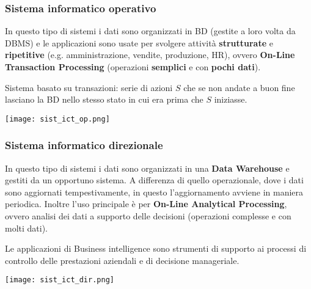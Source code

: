 \subsubsection{Sistema informatico operativo}
In questo tipo di sistemi i dati sono organizzati in BD (gestite a loro volta da DBMS) e le applicazioni sono usate per svolgere attività \textbf{strutturate} e \textbf{ripetitive} (e.g. amministrazione, vendite, produzione, HR), ovvero \textbf{On-Line Transaction Processing} (operazioni \textbf{semplici} e con \textbf{pochi dati}).
\begin{definition}
	Sistema basato su transazioni: serie di azioni $S$ che se non andate a buon fine lasciano la BD nello stesso stato in cui era prima che $S$ iniziasse.
\end{definition}
\begin{center}
	\texttt{[image: sist\_ict\_op.png]}
\end{center}

\subsubsection{Sistema informatico direzionale}
In questo tipo di sistemi i dati sono organizzati in una \textbf{Data Warehouse} e gestiti da un opportuno sistema. A differenza di quello operazionale, dove i dati sono aggiornati tempestivamente, in questo l'aggiornamento avviene in maniera periodica. Inoltre l'uso principale è per \textbf{On-Line Analytical Processing}, ovvero analisi dei dati a supporto delle decisioni (operazioni complesse e con molti dati).

\begin{definition}
	Le applicazioni di Business intelligence sono strumenti di supporto ai processi di controllo delle prestazioni aziendali e di decisione manageriale.
\end{definition}

\begin{center}
	\texttt{[image: sist\_ict\_dir.png]}
\end{center}

